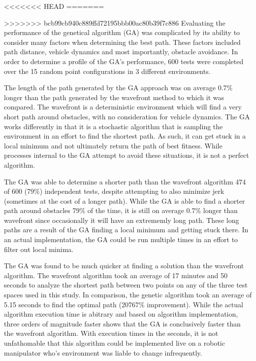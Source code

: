 	
<<<<<<< HEAD
=======

>>>>>>> bcb99cb940c889ffd72195bbb00ac80b39f7c886
Evaluating the performance of the genetical algorithm (GA) was complicated by its ability to consider many factors when determining the best path. These factors included path distance, vehicle dynamics and most importantly, obstacle avoidance. In order to determine a profile of the GA's performance, 600 tests were completed over the 15 random point configurations in 3 different environments.

The length of the path generated by the GA approach was on average 0.7\% longer than the path generated by the wavefront method to which it was compared. The wavefront is a deterministic environment which will find a very short path around obstacles, with no consideration for vehicle dynamics. The GA works differently in that it is a stochastic algorithm that is sampling the environment in an effort to find the shortest path. As such, it can get stuck in a local minimum and not ultimately return the path of best fitness. While processes internal to the GA attempt to avoid these situations, it is not a perfect algorithm.

The GA was able to determine a shorter path than the wavefront algorithm 474 of 600 (79\%) independent tests, despite attempting to also minimize jerk (sometimes at the cost of a longer path). While the GA is able to find a shorter path around obstacles 79\% of the time, it is still on average 0.7\% longer than wavefront since occasionally it will have an extrememly long path. These long paths are a result of the GA finding a local minimum and getting stuck there. In an actual implementation, the GA could be run multiple times in an effort to filter out local minima.

The GA was found to be much quicker at finding a solution than the wavefront algorithm. The wavefront algorithm took an average of 17 minutes and 50 seconds to analyze the shortest path between two points on any of the three test spaces used in this study. In comparison, the genetic algorithm took an average of 5.15 seconds to find the optimal path (20767\% improvement). While the actual algorithm execution time is abitrary and based on algorithm implementation, three orders of magnitude faster shows that the GA is conclusively faster than the wavefront algorithm. With execution times in the seconds, it is not unfathomable that this algorithm could be implemented live on a robotic manipulator who's environment was liable to change infrequently.

